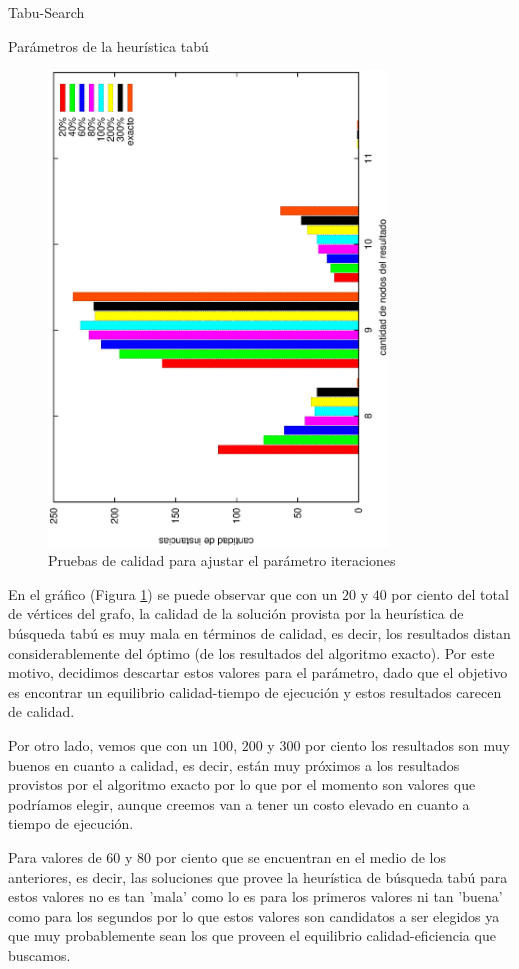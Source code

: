 \begin{section}{Tabu-Search}
\begin{subsection}{Parámetros de la heurística tabú}
	\begin{figure}[H]
		\centering
		  	\includegraphics[width=9cm,angle=-90]{tabu_search/iteraciones.eps}
		\caption{Pruebas de calidad para ajustar el parámetro iteraciones}
		\label{fig:Ajuste_del_parametro_iteraciones}
	\end{figure}

	En el gráfico (Figura \ref{fig:Ajuste_del_parametro_iteraciones}) se puede observar que con un $20$ y $40$ por ciento del total de vértices del grafo, la calidad de la solución provista por la heurística de búsqueda tabú es muy mala en términos de calidad, es decir, los resultados distan considerablemente del óptimo (de los resultados del algoritmo exacto). Por este motivo, decidimos descartar estos valores para el parámetro, dado que el objetivo es encontrar un equilibrio calidad-tiempo de ejecución y estos resultados carecen de calidad.

	Por otro lado, vemos que con un $100$, $200$ y $300$ por ciento los resultados son muy buenos en cuanto a calidad, es decir, están muy próximos a los resultados provistos por el algoritmo exacto por lo que por el momento son valores que podríamos elegir, aunque creemos van a tener un costo elevado en cuanto a tiempo de ejecución.

	Para valores de $60$ y $80$ por ciento que se encuentran en el medio de los anteriores, es decir, las soluciones que provee la heurística de búsqueda tabú para estos valores no es tan 'mala' como lo es para los primeros valores ni tan 'buena' como para los segundos por lo que estos valores son candidatos a ser elegidos ya que muy probablemente sean los que proveen el equilibrio calidad-eficiencia que buscamos.\Pa


\end{subsection}
\end{section}
